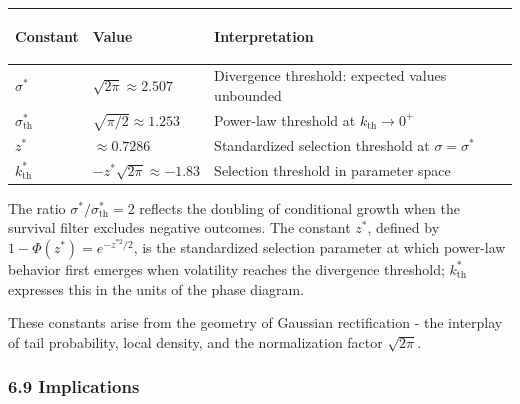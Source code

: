 \documentclass[
  11pt,
  openany]{article}
\newcounter{none} %
\begin{document}
{\def\LTcaptype{none} %
\begin{longtable}[]{@{}
  >{\raggedright\arraybackslash}p{}
  >{\raggedright\arraybackslash}p{}
  >{\raggedright\arraybackslash}p{}@{}}
\toprule\noalign{}
\begin{minipage}[b]{\linewidth}\raggedright
{\bfseries 

Constant

}
\end{minipage} & \begin{minipage}[b]{\linewidth}\raggedright
{\bfseries 

Value

}
\end{minipage} & \begin{minipage}[b]{\linewidth}\raggedright
{\bfseries 

Interpretation

}
\end{minipage} \\
\midrule\noalign{}
\endhead
\bottomrule\noalign{}
\endlastfoot
\(\sigma^*\) & \(\sqrt{2\pi} \approx 2.507\) & Divergence threshold:
expected values unbounded \\
\(\sigma^*_{\text{th}}\) & \(\sqrt{\pi/2} \approx 1.253\) & Power-law
threshold at \(k_{\text{th}} \to 0^+\) \\
\(z^*\) & \(\approx 0.7286\) & Standardized selection threshold at
\(\sigma = \sigma^*\) \\
\(k^*_{\text{th}}\) & \(-z^*\sqrt{2\pi} \approx -1.83\) & Selection
threshold in parameter space \\
\end{longtable}
}

The ratio \(\sigma^*/\sigma^*_{\text{th}} = 2\) reflects the doubling of
conditional growth when the survival filter excludes negative outcomes.
The constant \(z^*\), defined by \(1 - \Phi(z^*) = e^{-z^{*2}/2}\), is
the standardized selection parameter at which power-law behavior first
emerges when volatility reaches the divergence threshold;
\(k^*_{\text{th}}\) expresses this in the units of the phase diagram.

These constants arise from the geometry of Gaussian rectification - the
interplay of tail probability, local density, and the normalization
factor \(\sqrt{2\pi}\).

\subsubsection{6.9 Implications}\label{implications}
\end{document}
